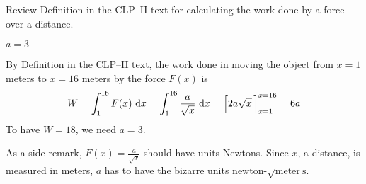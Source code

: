 \begin{hint}
Review Definition  in the
CLP--II text for calculating the work done by a force over a distance.
\end{hint}

\begin{answer}
$a=3$
\end{answer}

\begin{solution}
By Definition  in the CLP--II text, the work done in moving the object from $x = 1$ meters
to $x = 16$ meters by the force $F(x)$ is
\begin{align*}
W = \int_1^{16} F(x)\ \mathrm{d}x
= \int_1^{16} \frac{a}{\sqrt{x}}\ \mathrm{d}x
= \Big[2a\sqrt{x}\,\Big]_{x=1}^{x=16}
=6a
\end{align*}
To have $W=18$, we need $a=3$.

As a side remark, $F(x)= \frac{a}{\sqrt{x}}$ should have units Newtons.
Since $x$, a distance, is measured in  meters, $a$ has to have the bizarre
units newton-$\sqrt{\text{meter}}\text{s}$.
\end{solution}

